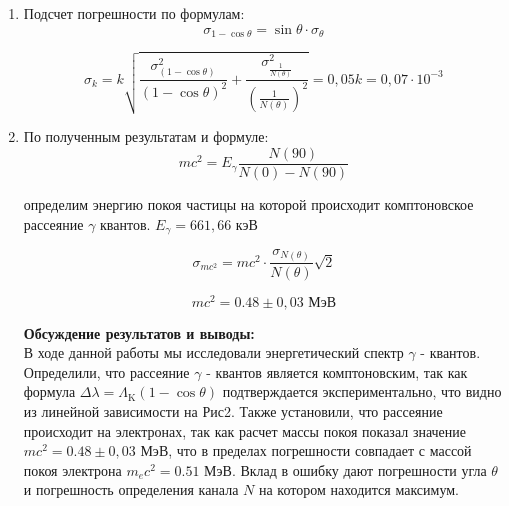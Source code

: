 \documentclass[a4paper, 12pt]{article}%
\begin{document}
\begin{enumerate}
		\item Подсчет погрешности по формулам: \\
		\[\sigma_{1-\cos\theta} = \sin\theta \cdot \sigma_{\theta}\]
		
		\[\sigma_k = k \sqrt{\frac{\sigma_{(1-\cos\theta)}^2}{(1-\cos\theta)^2} + \frac{\sigma_{\frac{1}{N(\theta)}}^2}{\left(\frac{1}{N(\theta)}\right)^2}} = 0,05 k = 0,07 \cdot 10^{-3}\]
		
		
		\item По полученным результатам и формуле:
		 $$mc^2 = E_\gamma \dfrac{N(90)}{N(0) - N(90)}$$
		
		определим энергию покоя частицы на которой происходит комптоновское рассеяние $\gamma$ квантов. $ E_\gamma = 661,66$ кэВ
		
		$$ \sigma_{mc^2} = mc^2 \cdot \frac{\sigma_{N(\theta)}}{N(\theta)}\sqrt{2}$$
		
		$$ mc^2 = 0.48 \pm 0,03 \text{ МэВ}$$
		
		
		\textbf{Обсуждение результатов и выводы: }\\
		
		В ходе данной работы мы исследовали энергетический спектр $\gamma$ - квантов. Определили, что рассеяние $\gamma$ - квантов является комптоновским, так как формула
		$\Delta \lambda=\Lambda_{\mathrm{K}}(1-\cos \theta)$ подтверждается экспериментально, что видно из линейной зависимости на Рис2.
		Также установили, что рассеяние происходит на электронах, так как расчет массы покоя показал значение $ mc^2 = 0.48 \pm 0,03 \text{ МэВ}$, что в пределах погрешности совпадает с массой покоя электрона $ m_ec^2 = 0.51 \text{ МэВ}$. Вклад в ошибку дают погрешности угла $\theta$ и погрешность определения канала $N$ на котором находится максимум.
		
		
		
		
		
		
		
		
		
		
		
		
		
		
		
		
		
		
		
		
	\end{enumerate}
	
	
	
	
	
	
	
	
	
	
	
	
	
	
	
	
\end{document}
